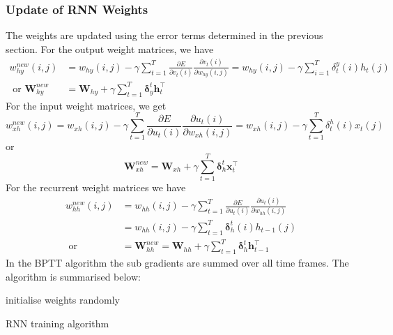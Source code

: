 \subsubsection{Update of RNN Weights}
The weights are updated using the error terms determined in the previous section.  For the output weight matrices, we have \begin{equation}
\begin{aligned}w_{hy}^{new}(i,j)&=w_{hy}(i,j)-\gamma\sum_{t=1}^T\frac{\partial E}{\partial v_t(i)}\frac{\partial v_t(i)}{\partial w_{hy}(i,j)}=w_{hy}(i,j)-\gamma\sum_{i=1}^T\delta_t^y(i)h_t(j)\\ \text{ or }\mathbf{W}_{hy}^{new}&=\mathbf{W}_{hy}+\gamma\sum_{t=1}^T\mathbf{\delta}_y^t\mathbf{h}_t^\top\end{aligned} \label{eqn_c3_bptt10}\end{equation}
For the input weight matrices, we get \begin{equation}
w_{xh}^{new}(i,j)=w_{xh}(i,j)-\gamma\sum_{t=1}^T\frac{\partial E}{\partial u_t(i)}\frac{\partial u_t(i)}{\partial w_{xh}(i,j)}=w_{xh}(i,j)-\gamma\sum_{t=1}^T\delta_t^h(i)x_t(j) \label{eqn_c3_bptt11}\end{equation}
or \begin{equation}
\mathbf{W}_{xh}^{new}=\mathbf{W}_{xh}+\gamma\sum_{t=1}^T\mathbf{\delta}_h^t\mathbf{x}_t^\top \label{eqn_c3_bptt_13}\end{equation}
For the recurrent weight matrices we have 
\begin{equation} \begin{split}w_{hh}^{new}(i,j)&=w_{hh}(i,j)-\gamma\sum_{t=1}^T\frac{\partial E}{\partial u_t(i)}\frac{\partial u_t(i)}{\partial w_{hh}(i,j)}\\ &=w_{hh}(i,j)-\gamma\sum_{t=1}^T\mathbf{\delta}_h^t(i)h_{t-1}(j)\\ \text{ or }&=\mathbf{W}_{hh}^{new}=\mathbf{W}_{hh}+\gamma\sum_{t=1}^T\mathbf{\delta}_h^t\mathbf{h}_{t-1}^\top \end{split} \label{eqn_c3_bptt14}\end{equation}
In the BPTT algorithm the sub gradients are summed over all time frames. The algorithm is summarised below:

\begin{algorithm}[H]
\SetAlgoLined
{}
 initialise weights randomly\;
 \caption{RNN training algorithm}
\end{algorithm}

